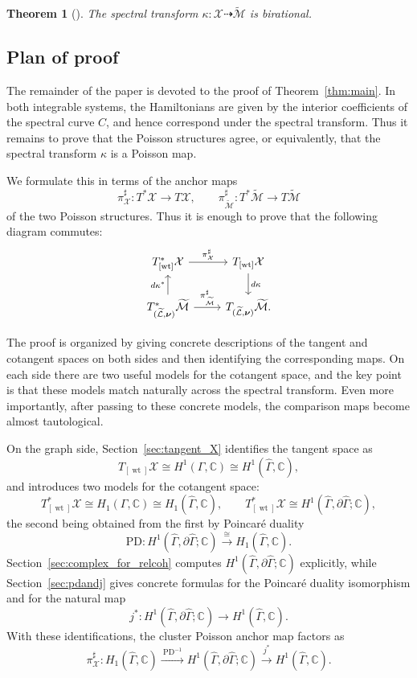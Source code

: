 \documentclass[dvipsnames,11pt]{article}
\newtheorem{theorem}{Theorem}[section]
\theoremstyle{definition}
\newcommand{\wt}{\operatorname{wt}}
\newcommand{\C}{{\mathbb C}}
\def\PD{\mathrm{PD}}
\begin{document}
\begin{theorem}[\cite{Fock, GGK}]\label{thm:inverse}
The spectral transform $\kappa:\mathcal X \dashrightarrow \widetilde{\mathcal M}$ is birational.
\end{theorem}

\subsection{Plan of proof}
The remainder of the paper is devoted to the proof of Theorem~\ref{thm:main}.
In both integrable systems, the Hamiltonians are given by the interior coefficients of the spectral curve \(C\), and hence correspond under the spectral transform. Thus it remains to prove that the Poisson structures agree, or equivalently, that the spectral transform $\kappa$ is a Poisson map.

We formulate this in terms of the anchor maps
\[
\pi^\sharp_{\mathcal X}:T^*\mathcal X\to T\mathcal X,
\qquad
\pi^\sharp_{\widetilde{\mathcal M}}:T^*\widetilde{\mathcal M}\to T\widetilde{\mathcal M}
\]
of the two Poisson structures. Thus it is enough to prove that the following diagram commutes:
\begin{equation}\label{eq:small_square}
\begin{tikzcd}
 T^*_{[\wt]}\mathcal X \arrow[r,"\pi^\sharp_{\mathcal X}"]
 & T_{[\wt]}\mathcal X \arrow[d,"d\kappa"] \\
 T^*_{(\widetilde{\mathcal L},\bm\nu)}\widetilde{\mathcal M}
 \arrow[u,"d\kappa^*"]
 \arrow[r,"\pi^\sharp_{\widetilde{\mathcal M}}"]
 & T_{(\widetilde{\mathcal L},\bm\nu)}\widetilde{\mathcal M}.
\end{tikzcd}
\end{equation}

The proof is organized by giving concrete descriptions of the tangent and cotangent spaces on both sides and then identifying the corresponding maps. On each side there are two useful models for the cotangent space, and the key point is that these models match naturally across the spectral transform. Even more importantly, after passing to these concrete models, the comparison maps become almost tautological.

On the graph side, Section~\ref{sec:tangent_X} identifies the tangent space as
\[
T_{[\wt]}\mathcal X \cong H^1(\Gamma,\C)\cong H^1(\widehat\Gamma,\C),
\]
and introduces two models for the cotangent space:
\[
T^*_{[\wt]}\mathcal X
\cong H_1(\Gamma,\C)\cong H_1(\widehat\Gamma,\C),
\qquad
T^*_{[\wt]}\mathcal X
\cong H^1(\widehat\Gamma,\partial\widehat\Gamma;\C),
\]
the second being obtained from the first by Poincar\'e duality
\[
\PD: H^1(\widehat\Gamma,\partial\widehat\Gamma;\C) \xrightarrow[]{\cong} H_1(\widehat\Gamma,\C).
\]
Section~\ref{sec:complex_for_relcoh} computes \(H^1(\widehat\Gamma,\partial\widehat\Gamma;\C)\) explicitly, while Section~\ref{sec:pdandj} gives concrete formulas for the Poincar\'e duality isomorphism and for the natural map
\[
j^*:H^1(\widehat\Gamma,\partial\widehat\Gamma;\C)\to H^1(\widehat\Gamma,\C).
\]
With these identifications, the cluster Poisson anchor map factors as
\[
\pi_{\mathcal X}^\sharp: H_1(\widehat\Gamma,\C)
\xrightarrow{\ \PD^{-1} \ }
H^1(\widehat\Gamma,\partial\widehat\Gamma;\C)
\xrightarrow{\ j^*\ }
H^1(\widehat\Gamma,\C).
\]
\end{document}
